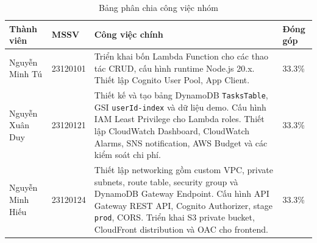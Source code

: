\begin{table}[H]
\centering
\begin{tabular}{|p{3.4cm}|p{2.2cm}|p{7.2cm}|p{1.7cm}|}
\hline
\textbf{Thành viên} & \textbf{MSSV} & \textbf{Công việc chính} & \textbf{Đóng góp} \\
\hline
Nguyễn Minh Tú & 23120101 & Triển khai bốn Lambda Function cho các thao tác CRUD, cấu hình runtime Node.js 20.x. Thiết lập Cognito User Pool, App Client. & 33.3\% \\
\hline
Nguyễn Xuân Duy & 23120121 & Thiết kế và tạo bảng DynamoDB \texttt{TasksTable}, GSI \texttt{userId-index} và dữ liệu demo. Cấu hình IAM Least Privilege cho Lambda roles. Thiết lập CloudWatch Dashboard, CloudWatch Alarms, SNS notification, AWS Budget và các kiểm soát chi phí. & 33.3\% \\
\hline
Nguyễn Minh Hiếu & 23120124 & Thiết lập networking gồm custom VPC, private subnets, route table, security group và DynamoDB Gateway Endpoint. Cấu hình API Gateway REST API, Cognito Authorizer, stage \texttt{prod}, CORS. Triển khai S3 private bucket, CloudFront distribution và OAC cho frontend. & 33.3\% \\
\hline
\end{tabular}
\caption{Bảng phân chia công việc nhóm}
\end{table}
